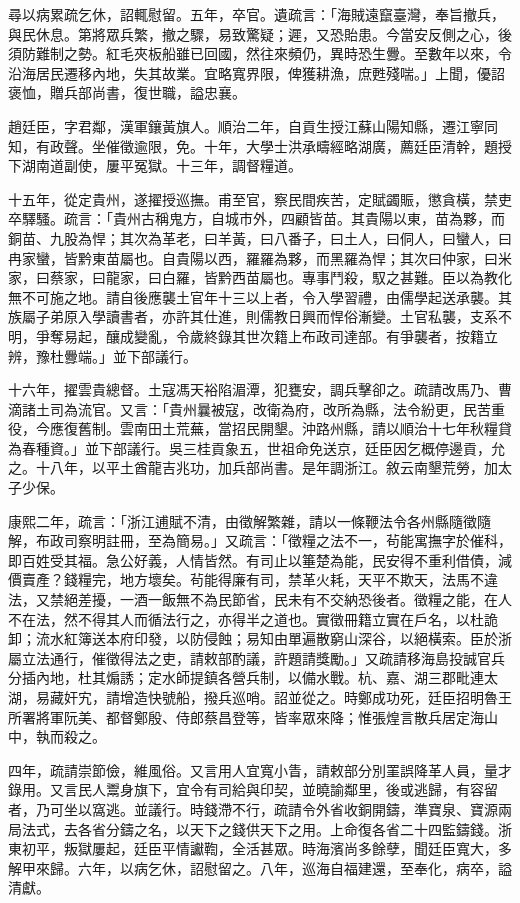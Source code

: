 \begin{pinyinscope}
尋以病累疏乞休，詔輒慰留。五年，卒官。遺疏言：「海賊遠竄臺灣，奉旨撤兵，與民休息。第將眾兵繁，撤之驟，易致驚疑；遲，又恐貽患。今當安反側之心，後須防難制之勢。紅毛夾板船雖已回國，然往來頻仍，異時恐生釁。至數年以來，令沿海居民遷移內地，失其故業。宜略寬界限，俾獲耕漁，庶甦殘喘。」上聞，優詔褒恤，贈兵部尚書，復世職，謚忠襄。

趙廷臣，字君鄰，漢軍鑲黃旗人。順治二年，自貢生授江蘇山陽知縣，遷江寧同知，有政聲。坐催徵逾限，免。十年，大學士洪承疇經略湖廣，薦廷臣清幹，題授下湖南道副使，屢平冤獄。十三年，調督糧道。

十五年，從定貴州，遂擢授巡撫。甫至官，察民間疾苦，定賦蠲賑，懲貪橫，禁吏卒驛騷。疏言：「貴州古稱鬼方，自城市外，四顧皆苗。其貴陽以東，苗為夥，而銅苗、九股為悍；其次為革老，曰羊黃，曰八番子，曰土人，曰侗人，曰蠻人，曰冉家蠻，皆黔東苗屬也。自貴陽以西，羅羅為夥，而黑羅為悍；其次曰仲家，曰米家，曰蔡家，曰龍家，曰白羅，皆黔西苗屬也。專事鬥殺，馭之甚難。臣以為教化無不可施之地。請自後應襲土官年十三以上者，令入學習禮，由儒學起送承襲。其族屬子弟原入學讀書者，亦許其仕進，則儒教日興而悍俗漸變。土官私襲，支系不明，爭奪易起，釀成變亂，令歲終錄其世次籍上布政司達部。有爭襲者，按籍立辨，豫杜釁端。」並下部議行。

十六年，擢雲貴總督。土寇馮天裕陷湄潭，犯甕安，調兵擊卻之。疏請改馬乃、曹滴諸土司為流官。又言：「貴州曩被寇，改衛為府，改所為縣，法令紛更，民苦重役，今應復舊制。雲南田土荒蕪，當招民開墾。沖路州縣，請以順治十七年秋糧貸為春種資。」並下部議行。吳三桂貢象五，世祖命免送京，廷臣因乞概停邊貢，允之。十八年，以平土酋龍吉兆功，加兵部尚書。是年調浙江。敘云南墾荒勞，加太子少保。

康熙二年，疏言：「浙江逋賦不清，由徵解繁雜，請以一條鞭法令各州縣隨徵隨解，布政司察明註冊，至為簡易。」又疏言：「徵糧之法不一，茍能寓撫字於催科，即百姓受其福。急公好義，人情皆然。有司止以箠楚為能，民安得不重利借債，減價賣產？錢糧完，地方壞矣。茍能得廉有司，禁革火耗，天平不欺天，法馬不違法，又禁絕差擾，一酒一飯無不為民節省，民未有不交納恐後者。徵糧之能，在人不在法，然不得其人而循法行之，亦得半之道也。實徵冊籍立實在戶名，以杜詭卸；流水紅簿送本府印發，以防侵蝕；易知由單遍散窮山深谷，以絕橫索。臣於浙屬立法通行，催徵得法之吏，請敕部酌議，許題請獎勵。」又疏請移海島投誠官兵分插內地，杜其煽誘；定水師提鎮各營兵制，以備水戰。杭、嘉、湖三郡毗連太湖，易藏奸宄，請增造快號船，撥兵巡哨。詔並從之。時鄭成功死，廷臣招明魯王所署將軍阮美、都督鄭殷、侍郎蔡昌登等，皆率眾來降；惟張煌言散兵居定海山中，執而殺之。

四年，疏請崇節儉，維風俗。又言用人宜寬小眚，請敕部分別罣誤降革人員，量才錄用。又言民人鬻身旗下，宜令有司給與印契，並曉諭鄰里，後或逃歸，有容留者，乃可坐以窩逃。並議行。時錢滯不行，疏請令外省收銅開鑄，準寶泉、寶源兩局法式，去各省分鑄之名，以天下之錢供天下之用。上命復各省二十四監鑄錢。浙東初平，叛獄屢起，廷臣平情讞鞫，全活甚眾。時海濱尚多餘孽，聞廷臣寬大，多解甲來歸。六年，以病乞休，詔慰留之。八年，巡海自福建還，至奉化，病卒，謚清獻。


\end{pinyinscope}
